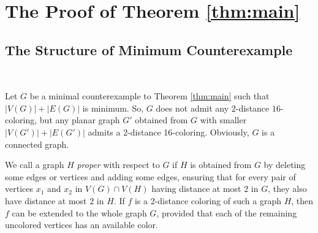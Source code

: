 \documentclass[12pt, reqno]{amsart}
\theoremstyle{plain}
\theoremstyle{definition}
\numberwithin{equation}{section}
\begin{document}







\section{The Proof of Theorem \ref{thm:main}} \label{sec:premECE}


\subsection{The Structure of Minimum Counterexample} \label{sub:premECE}~~\medskip

Let  $G$ be a minimal counterexample to Theorem \ref{thm:main} such that $|V(G)|+|E(G)|$ is minimum. So, $G$  does not admit any $2$-distance $16$-coloring, but 
any planar graph $G'$ obtained from $G$ with smaller $|V(G')|+|E(G')|$ admits a 2-distance 16-coloring.
Obviously,  $G$ is a connected graph. 


We call a graph $H$ \emph{proper} with respect to $G$ if $H$ is obtained from $G$ by deleting some edges or vertices and adding some edges, ensuring that for every pair of vertices $x_1$ and $x_2$ in $V(G) \cap V(H)$ having distance at most 2 in $G$, they also have distance at most $2$ in $H$.
If $f$ is a 2-distance coloring of such a graph $H$, then $f$ can be extended to the whole graph $G$, provided that each of the remaining uncolored vertices has an available color.\medskip

\end{document}
